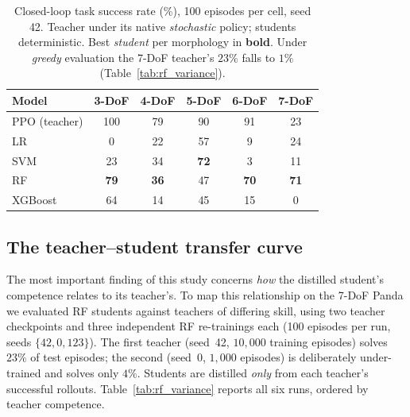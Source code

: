 \documentclass[conference]{IEEEtran}
\begin{document}
\begin{table}[t]
\centering
\caption{Closed-loop task success rate (\%), 100 episodes per cell, seed 42.
Teacher under its native \emph{stochastic} policy; students deterministic. Best
\emph{student} per morphology in \textbf{bold}. Under \emph{greedy} evaluation
the 7-DoF teacher's $23\%$ falls to $1\%$ (Table~\ref{tab:rf_variance}).}
\label{tab:success}
\begin{tabular}{lccccc}
\toprule
\textbf{Model} & \textbf{3-DoF} & \textbf{4-DoF} & \textbf{5-DoF} & \textbf{6-DoF} & \textbf{7-DoF} \\
\midrule
PPO (teacher) & 100 & 79 & 90 & 91 & 23 \\
\midrule
LR            & 0  & 22 & 57 & 9  & 24 \\
SVM           & 23 & 34 & \textbf{72} & 3  & 11 \\
RF            & \textbf{79} & \textbf{36} & 47 & \textbf{70} & \textbf{71} \\
XGBoost       & 64 & 14 & 45 & 15 & 0  \\
\bottomrule
\end{tabular}
\end{table}

\subsection{The teacher--student transfer curve}
\label{sec:rf_variance}

The most important finding of this study concerns \emph{how} the distilled
student's competence relates to its teacher's. To map this relationship on the
7-DoF Panda we evaluated RF students against teachers of differing skill, using
two teacher checkpoints and three independent RF re-trainings each (100 episodes
per run, seeds $\{42,0,123\}$). The first teacher (seed~42, $10{,}000$ training
episodes) solves $23\%$ of test episodes; the second (seed~0, $1{,}000$
episodes) is deliberately under-trained and solves only $4\%$. Students are
distilled \emph{only} from each teacher's successful rollouts.
Table~\ref{tab:rf_variance} reports all six runs, ordered by teacher competence.
\end{document}
